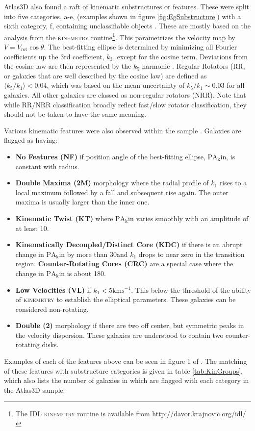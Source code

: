 	Atlas3D also found a raft of kinematic substructures or features. These were split into five categories, a-e, (examples shown in figure \ref{fig:EgSubstructure}) with a sixth category, f, containing unclassifiable objects \citep{Krajnovic2011}. These are mostly based on the analysis from the \textsc{kinemetry} routine\footnote{The IDL \textsc{kinemetry} routine is available from http://davor.krajnovic.org/idl/}. This parametrizes the velocity map by $V = V_\text{rot} \cos \theta$. The best-fitting ellipse is determined by minimizing all Fourier coefficients up the 3rd coefficient, $k_3$, except for the cosine term. Deviations from the cosine law are then represented by the $k_5$ harmonic \citep{Krajnovic2006}. Regular Rotators (RR, or galaxies that are well described by the cosine law) are defined as $\langle k_5/k_1 \rangle < 0.04$, which was based on the mean uncertainty of $k_5/k_1 \sim 0.03$ for all galaxies. All other galaxies are classed as non-regular rotators (NRR). Note that while RR/NRR classification broadly reflect fast/slow rotator classification, they should not be taken to have the same meaning. 

	Various kinematic features were also observed within the sample \citep{Krajnovic2011}. Galaxies are flagged as having:
	\begin{itemize}
		\item \textbf{No Features (NF)} if position angle of the best-fitting ellipse, $\mathrm{PA_kin}$, is constant with radius.
		\item \textbf{Double Maxima (2M)} morphology where the radial profile of $k_1$ rises to a local maximum followed by a fall and subsequent rise again. The outer maxima is usually larger than the inner one. 
		\item \textbf{Kinematic Twist (KT)} where $\mathrm{PA_kin}$ varies smoothly with an amplitude of at least 10\textdegrees. 
		\item \textbf{Kinematically Decoupled/Distinct Core (KDC)} if there is an abrupt change in $\mathrm{PA_kin}$ by more than 30\textdegree and $k_1$ drops to near zero in the transition region. \textbf{Counter-Rotating Cores (CRC)} are a special case where the change in $\mathrm{PA_kin}$ is about 180\textdegree.
		\item \textbf{Low Velocities (VL)} if $k_1 < 5 \mathrm{km s^{-1}}$. This below the threshold of the ability of \textsc{kinemetry} to establish the elliptical parameters. These galaxies can be considered non-rotating.
		\item \textbf{Double \textsigma (2\textsigma)} morphology if there are two off center, but symmetric peaks in the velocity dispersion. These galaxies are understood to contain two counter-rotating disks. 
	\end{itemize}
	Examples of each of the features above can be seen in figure 1 of \citet{Krajnovic2011}. The matching of these features with substructure categories is given in table \ref{tab:KinGroups}, which also lists the number of galaxies in which are flagged with each category in the Atlas3D sample. 


